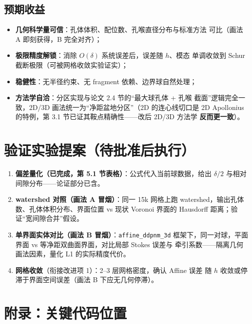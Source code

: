 \documentclass[11pt]{ctexart}
\begin{document}
\subsection{预期收益}

\begin{itemize}
  \item \textbf{几何科学量可信}：孔体体积、配位数、孔喉直径分布与标准方法
  可比（画法 A 即刻获得，B 完全对齐）；
  \item \textbf{极限精度解锁}：消除 $O(\delta)$ 系统误差后，误差随 $h$、模态
  单调收敛到 Schur 截断极限（可被网格收敛实验证实）；
  \item \textbf{稳健性}：无半径约束、无 fragment 依赖、边界球自然处理；
  \item \textbf{方法学自洽}：分区实现与论文 2.4 节的``最大球孔体 + 孔喉
  截面''逻辑完全一致，2D/3D 画法统一为``净距盆地分区''（2D 的连心线切口是
  2D Apollonius 的特例，第 3.1 节已证其鞍点精确性——改后 2D/3D 方法学
  \textbf{反而更一致}）。
\end{itemize}

\section{验证实验提案（待批准后执行）}

\begin{enumerate}
  \item \textbf{偏差量化（已完成，第 5.1 节表格）}：公式代入当前球数据，给出
  $\delta/2$ 与相对间隙分布——论证部分已含。
  \item \textbf{watershed 对照（画法 A 冒烟）}：同一 15k 网格上跑
  watershed，输出孔体数、孔体体积分布、界面位置 vs 现状 Voronoi 界面的
  Hausdorff 距离；验证``宽间隙合并''假设。
  \item \textbf{单界面实体对比（画法 B 冒烟）}：\texttt{affine\_ddpnm\_3d}
  框架下，同一对球，平面界面 vs 等净距双曲面界面，对比局部 Stokes 误差与
  牵引系数——隔离几何画法因素，量化 L1 的实际精度代价。
  \item \textbf{网格收敛}（衔接改进项 1）：2--3 层网格密度，确认 Affine 误差
  随 $h$ 收敛或停滞于界面空间误差（画法 B 下应无几何停滞）。
\end{enumerate}

\section*{附录：关键代码位置}
\end{document}
